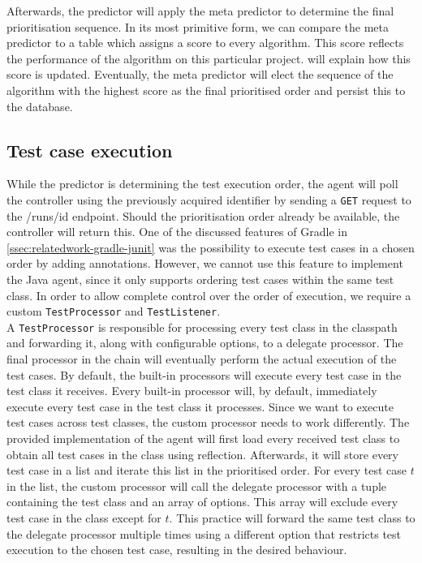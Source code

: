 \noindent Afterwards, the predictor will apply the meta predictor to determine the final prioritisation sequence. In its most primitive form, we can compare the meta predictor to a table which assigns a score to every algorithm. This score reflects the performance of the algorithm on this particular project.  will explain how this score is updated. Eventually, the meta predictor will elect the sequence of the algorithm with the highest score as the final prioritised order and persist this to the database.

\subsection{Test case execution}
While the predictor is determining the test execution order, the agent will poll the controller using the previously acquired identifier by sending a \texttt{GET} request to the /runs/id endpoint. Should the prioritisation order already be available, the controller will return this. One of the discussed features of Gradle in \cref{ssec:relatedwork-gradle-junit} was the possibility to execute test cases in a chosen order by adding annotations. However, we cannot use this feature to implement the Java agent, since it only supports ordering test cases within the same test class. In order to allow complete control over the order of execution, we require a custom \texttt{TestProcessor} and \texttt{TestListener}.\\

\noindent A \texttt{TestProcessor} is responsible for processing every test class in the classpath and forwarding it, along with configurable options, to a delegate processor. The final processor in the chain will eventually perform the actual execution of the test cases. By default, the built-in processors will execute every test case in the test class it receives. Every built-in processor will, by default, immediately execute every test case in the test class it processes. Since we want to execute test cases across test classes, the custom processor needs to work differently. The provided implementation of the agent will first load every received test class to obtain all test cases in the class using reflection. Afterwards, it will store every test case in a list and iterate this list in the prioritised order. For every test case $t$ in the list, the custom processor will call the delegate processor with a tuple containing the test class and an array of options. This array will exclude every test case in the class except for $t$. This practice will forward the same test class to the delegate processor multiple times using a different option that restricts test execution to the chosen test case, resulting in the desired behaviour.\\

